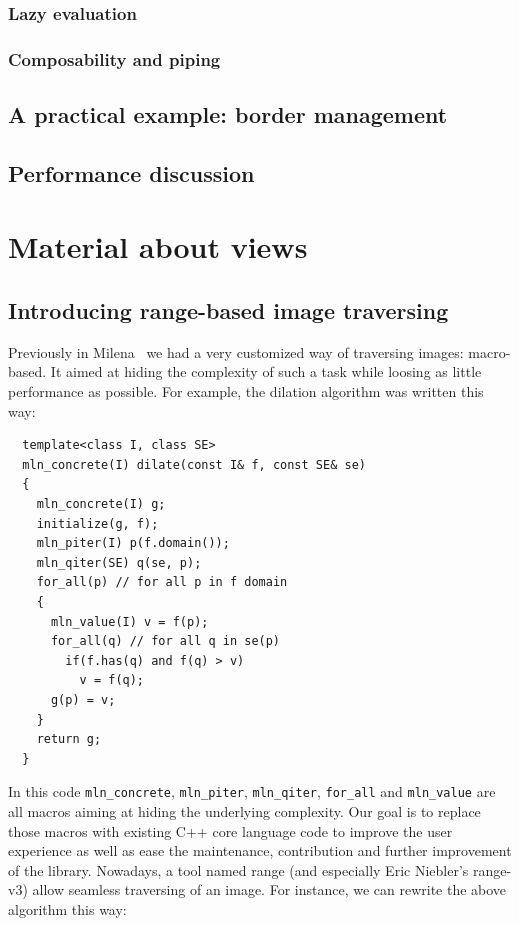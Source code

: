 \subsection{Lazy evaluation}

\subsection{Composability and piping}

\section{A practical example: border management}

\section{Performance discussion}


\cleardoublepage

\chapter*{Material about views}

\section*{Introducing range-based image traversing}
\label{sec.range.traversing}

Previously in Milena~\cite{levillain.2009.ismm} we had a very customized way of traversing images: macro-based. It aimed
at hiding the complexity of such a task while loosing as little performance as possible. For example, the dilation
algorithm was written this way:

\begin{verbatim}
  template<class I, class SE>
  mln_concrete(I) dilate(const I& f, const SE& se)
  {
    mln_concrete(I) g;
    initialize(g, f);
    mln_piter(I) p(f.domain());
    mln_qiter(SE) q(se, p);
    for_all(p) // for all p in f domain
    {
      mln_value(I) v = f(p);
      for_all(q) // for all q in se(p)
        if(f.has(q) and f(q) > v)
          v = f(q);
      g(p) = v;
    }
    return g;
  }
\end{verbatim}

In this code \texttt{mln\_concrete}, \texttt{mln\_piter}, \texttt{mln\_qiter}, \texttt{for\_all} and \texttt{mln\_value}
are all macros aiming at hiding the underlying complexity. Our goal is to replace those macros with existing C++ core
language code to improve the user experience as well as ease the maintenance, contribution and further improvement of
the library. Nowadays, a tool named range (and especially Eric Niebler's range-v3) allow seamless traversing of an
image. For instance, we can rewrite the above algorithm this way:

